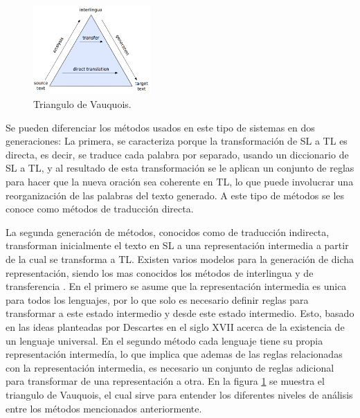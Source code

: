 \documentclass[12pt, letterpaper]{article}
\begin{document}
\begin{multicols}{2}
                \begin{figure}[H]
                    \centering
                    \includegraphics[width=0.4\textwidth]{triangle.png}
                    \caption[]{Triangulo de Vauquois.}
                    \label{triangle}
                \end{figure}
                
                
                Se pueden diferenciar los métodos usados en este tipo de sistemas en dos generaciones\cite{HUTCHINS1995431}:
                La primera, se caracteriza porque la transformación de SL a TL es directa, es decir, se traduce
                cada palabra por separado, usando un diccionario de SL a TL, y al resultado de esta transformación
                se le aplican un conjunto de reglas para hacer que la nueva oración sea coherente en TL, lo que 
                puede involucrar una reorganización de las palabras del texto generado. A este tipo de métodos se 
                les conoce como métodos de traducción directa.

                La segunda generación de métodos, conocidos como de traducción indirecta, transforman inicialmente el texto
                en SL a una representación intermedia a partir de la cual se transforma a TL. Existen varios modelos para
                la generación de dicha representación, siendo los mas conocidos los métodos de interlingua y de transferencia 
                \cite{Musatafa}\cite{HUTCHINS1995431}\cite{Mohamed}. En el primero se asume que la representación intermedia es 
                unica para todos los lenguajes, por lo que solo es necesario definir reglas para transformar a este estado 
                intermedio y desde este estado intermedio. Esto, basado en las ideas planteadas por Descartes en el siglo XVII 
                acerca de la existencia de un lenguaje universal. En el segundo método cada lenguaje tiene su propia representación 
                intermedía, lo que implica que ademas de las reglas relacionadas con la representación intermedia, es necesario un 
                conjunto de reglas adicional para transformar de una representación a otra. En la figura \ref{triangle} se muestra el 
                triangulo de Vauquois, el cual sirve para entender los diferentes niveles de análisis entre los métodos mencionados 
                anteriormente. 
                

\end{multicols}
\end{document}

